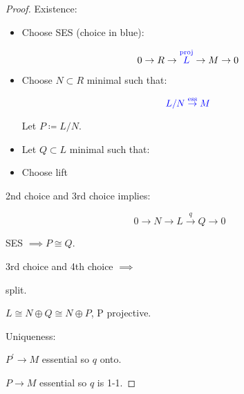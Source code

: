 \documentclass{article}
\theoremstyle{definition}
\begin{document}
\begin{proof}
    Existence:

    \begin{itemize}
        \item Choose SES (choice in blue):
        
        \[
            0 \to R \to {\color{blue}\overset{\text{proj}}{L}} \to M \to 0
        \]

        \item Choose \(N \subset R\) minimal such that:
        
        \[
            {\color{blue} L / N \overset{\text{ess}}{\to} M}
        \]

        Let \(P \coloneqq L / N\).

        \item Let \(Q \subset L\) minimal such that:
        
        \begin{center}
        \end{center}

        \item Choose lift
        
        \begin{center}
        \end{center}

    \end{itemize} 

    2nd choice and 3rd choice implies:

    \[
        0 \to N \to L\overset{q}{\to} Q \to 0
    \]

    SES \(\implies P \cong Q\).

    3rd choice and 4th choice \(\implies\) split.

    \(L \cong N \oplus Q \cong N \oplus P\), P projective. 

    Uniqueness:

    \begin{center}
    \end{center}

    \(P^{\prime} \to M\) essential so \(q\) onto.

    \(P \to M\) essential so \(q\) is 1-1.
    
\end{proof}
\end{document}
